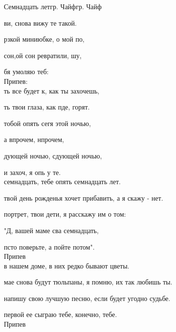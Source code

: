 \documentclass[11pt,a5paper]{book}
\renewcommand{\tt}{\indent \indent}
\begin{document}
\begin{song}{Семнадцать лет}{}{гр. Чайф}{гр. Чайф}{}{}

ви,  снова вижу те такой.\par
{}рзкой миниюбке, о мой по,\par
{} сон,ой сон ревратили, шу,\par
{}бя умоляю теб:\\
 
Припев:\\

ть все будет к, как ты захочешь,\par
{}ть твои глаза, как пде, горят.\par
{} тобой опять сегя этой ночью,\par
{} а впрочем, нпрочем,\par
{}дующей ночью, сдующей ночью,\par
{}и захоч, я опь у те.\\
 
\newpage
{} семнадцать, тебе опять семнадцать лет.\par
{} твой день рожденья хочет прибавить, а я скажу - нет.\par
{} портрет, твои дети, я расскажу им о том:\par
\noindent"Д, вашей маме сва семнадцать,\par
{} псто поверьте, а пойте потом".\\
 
Припев\\
 
 в нашем доме, в них редко бывают цветы.\par
{} мае снова будут тюльпаны, я помню, их так любишь ты.\par
{} напишу свою лучшую песню, если будет угодно судьбе.\par
{} первой ее сыграю тебе, конечно, тебе.\\

Припев\\


\end{song}
\end{document}

